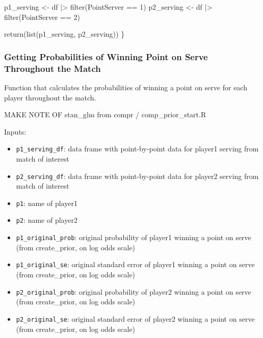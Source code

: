 \documentclass[
  letterpaper,
  DIV=11,
  numbers=noendperiod]{scrartcl}
\newenvironment{Shaded}{\begin{snugshade}}{\end{snugshade}}
\newcommand{\DecValTok}[1]{\textcolor[rgb]{0.68,0.00,0.00}{#1}}
\newcommand{\FunctionTok}[1]{\textcolor[rgb]{0.28,0.35,0.67}{#1}}
\newcommand{\NormalTok}[1]{\textcolor[rgb]{0.00,0.23,0.31}{#1}}
\newcommand{\OtherTok}[1]{\textcolor[rgb]{0.00,0.23,0.31}{#1}}
\newcommand{\SpecialCharTok}[1]{\textcolor[rgb]{0.37,0.37,0.37}{#1}}
\providecommand{\tightlist}{%
  \setlength{\itemsep}{0pt}\setlength{\parskip}{0pt}}\usepackage{longtable,booktabs,array}
\begin{document}
\begin{Shaded}
\begin{Highlighting}[]
\NormalTok{  p1\_serving }\OtherTok{\textless{}{-}}\NormalTok{ df }\SpecialCharTok{|\textgreater{}} \FunctionTok{filter}\NormalTok{(PointServer }\SpecialCharTok{==} \DecValTok{1}\NormalTok{)}
\NormalTok{  p2\_serving }\OtherTok{\textless{}{-}}\NormalTok{ df }\SpecialCharTok{|\textgreater{}} \FunctionTok{filter}\NormalTok{(PointServer }\SpecialCharTok{==} \DecValTok{2}\NormalTok{)}
  
  \FunctionTok{return}\NormalTok{(}\FunctionTok{list}\NormalTok{(p1\_serving, p2\_serving))}
\NormalTok{\}}
\end{Highlighting}
\end{Shaded}

\linespread{2}

\subsubsection{Getting Probabilities of Winning Point on Serve
Throughout the
Match}\label{getting-probabilities-of-winning-point-on-serve-throughout-the-match}

Function that calculates the probabilities of winning a point on serve
for each player throughout the match.

MAKE NOTE OF stan\_glm from compr / comp\_prior\_start.R

Inputs:

\begin{itemize}
\tightlist
\item
  \texttt{p1\_serving\_df}: data frame with point-by-point data for
  player1 serving from match of interest
\item
  \texttt{p2\_serving\_df}: data frame with point-by-point data for
  player2 serving from match of interest
\item
  \texttt{p1}: name of player1
\item
  \texttt{p2}: name of player2
\item
  \texttt{p1\_original\_prob}: original probability of player1 winning a
  point on serve (from create\_prior, on log odds scale)
\item
  \texttt{p1\_original\_se}: original standard error of player1 winning
  a point on serve (from create\_prior, on log odds scale)
\item
  \texttt{p2\_original\_prob}: original probability of player2 winning a
  point on serve (from create\_prior, on log odds scale)
\item
  \texttt{p2\_original\_se}: original standard error of player2 winning
  a point on serve (from create\_prior, on log odds scale)
\end{itemize}
\end{document}
